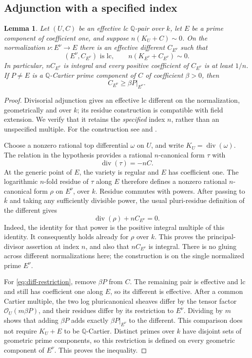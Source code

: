 \documentclass[11pt]{article}
\numberwithin{equation}{section}
\newtheorem{lemma}[theorem]{Lemma}
\theoremstyle{definition}
\newcommand{\Q}{\mathbb Q}
\newcommand{\kb}{\overline{k}}
\newcommand{\OO}{\mathcal O}
\begin{document}
\subsection{Adjunction with a specified index}

\begin{lemma}\label{lem:adjunction}
Let $(U,C)$ be an effective lc $\Q$-pair over $k$, let $E$ be a prime
component of coefficient one, and suppose $n(K_U+C)\sim0$. On the
normalization $\nu:E^\nu\to E$ there is an effective different
$C_{E^\nu}$ such that
\[
 (E^\nu,C_{E^\nu})\text{ is lc},\qquad
 n(K_{E^\nu}+C_{E^\nu})\sim0.
\]
In particular, $nC_{E^\nu}$ is integral and every positive coefficient
of $C_{E^\nu}$ is at least $1/n$. If $P\ne E$ is a $\Q$-Cartier prime
component of $C$ of coefficient $\beta>0$, then
\begin{equation}\label{eq:diff-restriction}
 C_{E^\nu}\geq\beta P|_{E^\nu}.
\end{equation}
\end{lemma}

\begin{proof}
Divisorial adjunction gives an effective lc different on the
normalization, geometrically and over $k$; its residue construction is
compatible with field extension. We verify that it retains the
\emph{specified} index $n$, rather than an unspecified multiple.
For the construction see \cite[Definition~122 and equations
(122.7)--(122.10)]{KollarDraft} and \cite{Kollar2013}.

Choose a nonzero rational top differential $\omega$ on $U$, and write
$K_U=\operatorname{div}(\omega)$. The relation in the hypothesis
provides a rational $n$-canonical form $\tau$ with
\[
 \operatorname{div}(\tau)=-nC.
\]
At the generic point of $E$, the variety is regular and $E$ has
coefficient one. The logarithmic $n$-fold residue of $\tau$ along $E$
therefore defines a nonzero rational $n$-canonical form $\rho$ on
$E^\nu$, over $k$. Residue commutes with powers. After passing to
$\kb$ and taking any sufficiently divisible power, the usual
pluri-residue definition of the different gives
\[
 \operatorname{div}(\rho)+nC_{E^\nu}=0.
\]
Indeed, the identity for that power is the positive integral multiple
of this identity. It consequently holds already for $\rho$ over $k$.
This proves the principal-divisor assertion at index $n$, and also
that $nC_{E^\nu}$ is integral. There is no gluing across different
normalizations here; the construction is on the single normalized
prime $E^\nu$.

For \eqref{eq:diff-restriction}, remove $\beta P$ from $C$. The remaining
pair is effective and lc and still has coefficient one along $E$,
so its different is effective. After a common Cartier multiple, the
two log pluricanonical sheaves differ by the tensor factor
$\OO_U(m\beta P)$, and their residues differ by its restriction to
$E^\nu$. Dividing by $m$ shows that adding $\beta P$ adds exactly
$\beta P|_{E^\nu}$ to the different. This comparison does not require
$K_U+E$ to be $\Q$-Cartier. Distinct primes over $k$ have disjoint sets of geometric
prime components, so this restriction is defined on every geometric
component of $E^\nu$. This proves the inequality.
\end{proof}
\end{document}
